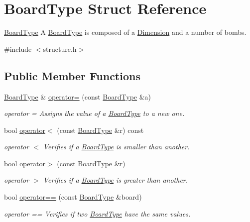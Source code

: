 \hypertarget{struct_board_type}{}\section{Board\+Type Struct Reference}
\label{struct_board_type}


\hyperlink{struct_board_type}{Board\+Type} A \hyperlink{struct_board_type}{Board\+Type} is composed of a \hyperlink{struct_dimension}{Dimension} and a number of bombs.  




{\ttfamily \#include $<$structure.\+h$>$}

\subsection*{Public Member Functions}
\begin{DoxyCompactItemize}
\item 
\hyperlink{struct_board_type}{Board\+Type} \& \hyperlink{struct_board_type_a9747ba7e3183a87070bf6458d3a9c976}{operator=} (const \hyperlink{struct_board_type}{Board\+Type} \&a)
\begin{DoxyCompactList}\small\item\em operator = Assigns the value of a \hyperlink{struct_board_type}{Board\+Type} to a new one. \end{DoxyCompactList}\item 
bool \hyperlink{struct_board_type_a28a88d9da8a9fdd94738d12c7192b005}{operator$<$} (const \hyperlink{struct_board_type}{Board\+Type} \&r) const
\begin{DoxyCompactList}\small\item\em operator $<$ Verifies if a \hyperlink{struct_board_type}{Board\+Type} is smaller than another. \end{DoxyCompactList}\item 
bool \hyperlink{struct_board_type_a7e193ddf65e7ce01610ecb2e88eca0d7}{operator$>$} (const \hyperlink{struct_board_type}{Board\+Type} \&r)
\begin{DoxyCompactList}\small\item\em operator $>$ Verifies if a \hyperlink{struct_board_type}{Board\+Type} is greater than another. \end{DoxyCompactList}\item 
bool \hyperlink{struct_board_type_a4a983738b8a82c018896deae60ff66dd}{operator==} (const \hyperlink{struct_board_type}{Board\+Type} \&board)
\begin{DoxyCompactList}\small\item\em operator == Verifies if two \hyperlink{struct_board_type}{Board\+Type} have the same values. \end{DoxyCompactList}\end{DoxyCompactItemize}
